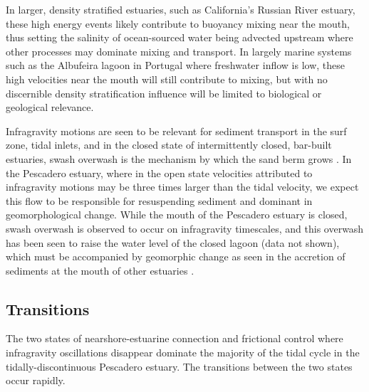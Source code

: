 In larger, density stratified estuaries, such as California's Russian River
estuary, these high energy events likely contribute to buoyancy mixing
near the mouth, thus setting the salinity of ocean-sourced water being
advected upstream where other processes may dominate mixing and transport.
In largely marine systems such as the Albufeira lagoon in Portugal
where freshwater inflow is low, these high velocities near the mouth
will still contribute to mixing, but with no discernible density stratification
influence will be limited to biological or geological relevance. 

Infragravity motions are seen to be relevant for sediment transport
in the surf zone, tidal inlets, and in the closed state of intermittently
closed, bar-built estuaries, swash overwash is the mechanism by which
the sand berm grows \parencite{beach_suspended_1988,green_processes_2001,baldock_morphodynamic_2008}.
In the Pescadero estuary, where in the open state velocities attributed
to infragravity motions may be three times larger than the tidal velocity,
we expect this flow to be responsible for resuspending sediment and
dominant in geomorphological change. While the mouth of the Pescadero
estuary is closed, swash overwash is observed to occur on infragravity
timescales, and this overwash has been seen to raise the water level
of the closed lagoon (data not shown), which must be accompanied by
geomorphic change as seen in the accretion of sediments at the mouth
of other estuaries \parencite{baldock_morphodynamic_2008}.


\subsection{Transitions\label{sub:Transitions}}

The two states of nearshore-estuarine connection and frictional control
where infragravity oscillations disappear dominate the majority of
the tidal cycle in the tidally-discontinuous Pescadero estuary. The
transitions between the two states occur rapidly. 

